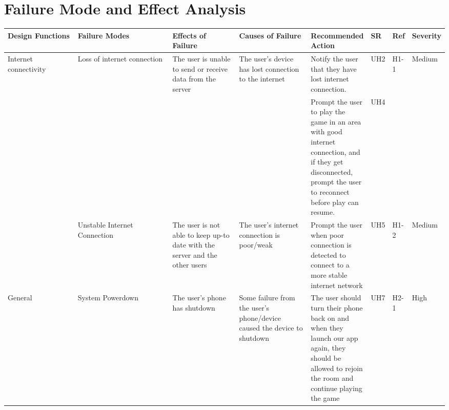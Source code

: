 \documentclass{article}
\begin{document}

\section{Failure Mode and Effect Analysis}

\begin{table}[H]
    \begin{adjustbox}{width=(/5)}
    \centering
    

    \begin{tabular}{|p{0.20\linewidth} | p{0.30\linewidth} | p{0.20\linewidth}|  p{0.20\linewidth}|  p{0.30\linewidth}|  p{0.07\linewidth}|  p{0.07\linewidth}|p{0.12\linewidth}| }
    \hline
         \textbf{Design Functions} & \textbf{Failure Modes} & \textbf{Effects of Failure} & \textbf{Causes of Failure} & \textbf{Recommended Action} & \textbf{SR} & \textbf{Ref} & \textbf{Severity}\\
         \hline
        Internet connectivity      &      Loss of internet connection           &       The user is unable to send or receive data from the server                      &                The user's device has lost connection to the internet            &                  Notify the user that they have lost internet connection. &UH2&H1-1&Medium\\&&&& Prompt the user to play the game in an area with good internet connection, and if they get disconnected, prompt the user to reconnect before play can resume.           & UH4            &           &                  \\
                                   &     Unstable Internet Connection     &  The user is not able to keep up-to date with the server and the other users &  The user's internet connection is poor/weak    &        Prompt the user when poor connection is detected to connect to a more stable internet network           &  UH5           &  H1-2           &    Medium              \\
          \hline
        General                    &      System Powerdown     &          The user's phone has shutdown                   &     Some failure from the user's phone/device caused the device to shutdown        &     The user should turn their phone back on and when they launch our app again, they should be allowed to rejoin the room and continue playing the game       & UH7            &   H2-1           &        High          \\

\end{tabular}
\end{adjustbox}
\end{table}
\end{document}
